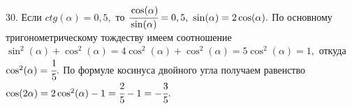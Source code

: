 30. Если $ctg(\alpha)=0,5,$ то $\cfrac{\cos(\alpha)}{\sin(\alpha)}=0,5,\ \sin(\alpha)=2\cos(\alpha).$ По основному тригонометрическому тождеству имеем соотношение
$\sin^2(\alpha)+\cos^2(\alpha)=4\cos^2(\alpha)+\cos^2(\alpha)=5\cos^2(\alpha)=1,$ откуда $\cos^2(\alpha)=\cfrac{1}{5}.$ По формуле косинуса двойного угла получаем
равенство $\cos(2\alpha)=2\cos^2(\alpha)-1=\cfrac{2}{5}-1=-\cfrac{3}{5}.$\\
